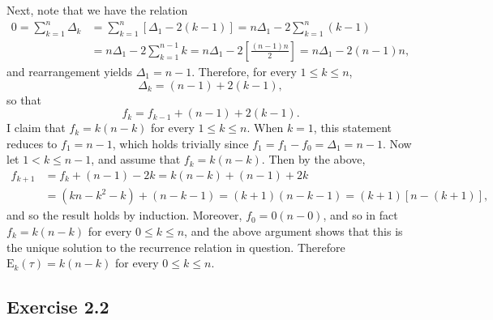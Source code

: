 \documentclass[12pt]{article}
\newcommand{\E}{\mathrm{E}}
\begin{document}
Next, note that we have the relation
\begin{align*}
0 = \sum_{k=1}^n \Delta_k &= \sum_{k=1}^n [\Delta_1 - 2(k-1)] = n\Delta_1 - 2\sum_{k=1}^n (k-1) \\
&= n\Delta_1 - 2\sum_{k=1}^{n-1} k = n\Delta_1 - 2\left[\frac{(n-1)n}{2}\right] = n\Delta_1 - 2(n-1)n,
\end{align*}
and rearrangement yields $\Delta_1 = n - 1$. Therefore, for every $1 \leq k \leq n$,
\begin{equation*}
\Delta_k = (n-1) + 2(k-1),
\end{equation*}
so that
\begin{equation*}
f_k = f_{k-1} + (n-1) + 2(k-1).
\end{equation*}
I claim that $f_k = k(n-k)$ for every $1 \leq k \leq n$. When $k=1$, this statement reduces to $f_1 = n-1$, which holds trivially since $f_1 = f_1 - f_0 = \Delta_1 = n-1$. Now let $1 < k \leq n-1$, and assume that $f_k = k(n-k)$. Then by the above,
\begin{align*}
f_{k+1} &= f_k + (n-1) - 2k = k(n-k) + (n-1) + 2k \\
&= (kn-k^2-k)+(n-k-1) = (k+1)(n-k-1) = (k+1)[n-(k+1)],
\end{align*}
and so the result holds by induction. Moreover, $f_0 = 0(n-0)$, and so in fact $f_k = k(n-k)$ for every $0 \leq k \leq n$, and the above argument shows that this is the unique solution to the recurrence relation in question. Therefore $\E_k(\tau) = k(n-k)$ for every $0 \leq k \leq n$.

\subsection*{Exercise 2.2}
\end{document}
